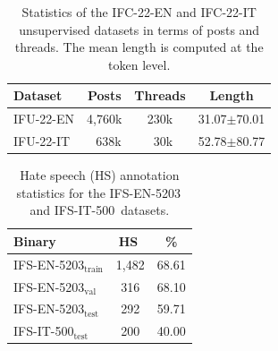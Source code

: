 \documentclass[11pt]{article}
\newcommand{\dsENcorpus}{IFU-22-EN}
\newcommand{\dsITcorpus}{IFU-22-IT}
\newcommand{\dsENclassification}{IFS-EN-5203}
\newcommand{\dsITclassification}{IFS-IT-500}
\begin{document}
\begin{table}[t]
  \centering
  \caption{Statistics of the IFC-22-EN and IFC-22-IT unsupervised datasets in terms of posts and threads. The mean length is computed at the token level.}
  \begin{tabular}{l|ccc}
      \hline
      \textbf{Dataset} & \textbf{Posts} & \textbf{Threads} & \textbf{Length} \\
      \hline
      \dsENcorpus & 4,760k & 230k & 31.07$\pm$70.01 \\
      \dsITcorpus & \,\,\,\,638k & \,\,\,30k & 52.78$\pm$80.77 \\
      \hline
  \end{tabular}
  \label{tab:english-italian-unsupervised-datasets-stats}
\end{table}

\begin{table}[t]
  \caption{Hate speech (HS) annotation statistics for the \dsENclassification\, and \dsITclassification\, datasets.}
  \label{tab:english-italian-supervised-datasets-partition-stats}
  \centering
  \begin{tabular}{l|cc}
  \hline
   \bf Binary &  \bf HS\,\, & \bf \% \\ %
  \hline
  \dsENclassification$_{\mbox{train}}$ 	&  1,482 & 68.61 \\ %
  \dsENclassification$_{\mbox{val}}$ 	  &  316   & 68.10 \\ %
  \dsENclassification$_{\mbox{test}}$ 	&  292   & 59.71 \\ %
  \dsITclassification$_{\mbox{test}}$   &  200   & 40.00 \\ %
  \hline
  \end{tabular}
\end{table}
\end{document}
